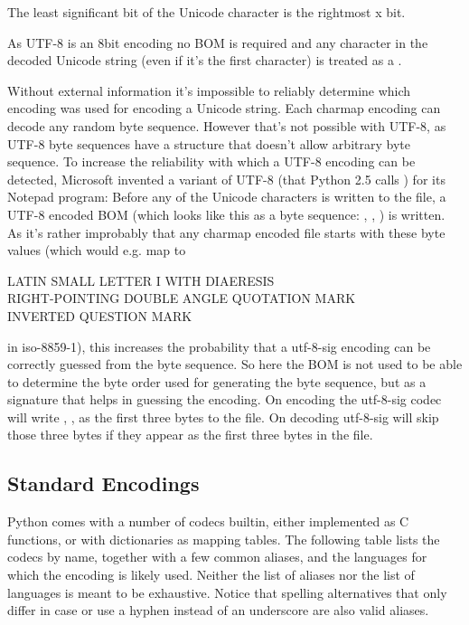 The least significant bit of the Unicode character is the rightmost x
bit.

As UTF-8 is an 8bit encoding no BOM is required and any 
character in the decoded Unicode string (even if it's the first
character) is treated as a .

Without external information it's impossible to reliably determine
which encoding was used for encoding a Unicode string. Each charmap
encoding can decode any random byte sequence. However that's not
possible with UTF-8, as UTF-8 byte sequences have a structure that
doesn't allow arbitrary byte sequence. To increase the reliability
with which a UTF-8 encoding can be detected, Microsoft invented a
variant of UTF-8 (that Python 2.5 calls ) for its Notepad
program: Before any of the Unicode characters is written to the file,
a UTF-8 encoded BOM (which looks like this as a byte sequence: ,
, ) is written. As it's rather improbably that any
charmap encoded file starts with these byte values (which would e.g. map to

   LATIN SMALL LETTER I WITH DIAERESIS \\
   RIGHT-POINTING DOUBLE ANGLE QUOTATION MARK \\
   INVERTED QUESTION MARK

in iso-8859-1), this increases the probability that a utf-8-sig
encoding can be correctly guessed from the byte sequence. So here the
BOM is not used to be able to determine the byte order used for
generating the byte sequence, but as a signature that helps in
guessing the encoding. On encoding the utf-8-sig codec will write
, ,  as the first three bytes to the file.
On decoding utf-8-sig will skip those three bytes if they appear as the
first three bytes in the file.


\subsection{Standard Encodings\label{standard-encodings}}

Python comes with a number of codecs builtin, either implemented as C
functions, or with dictionaries as mapping tables. The following table
lists the codecs by name, together with a few common aliases, and the
languages for which the encoding is likely used. Neither the list of
aliases nor the list of languages is meant to be exhaustive. Notice
that spelling alternatives that only differ in case or use a hyphen
instead of an underscore are also valid aliases.

